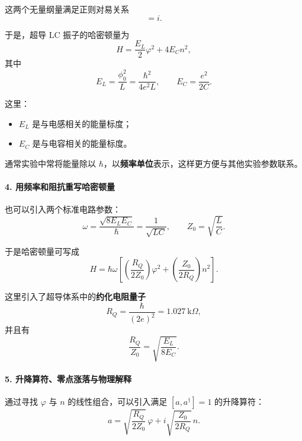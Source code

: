 \documentclass[12pt,a4paper,oneside]{ctexbook}
\begin{document}
这两个无量纲量满足正则对易关系
\begin{equation}
    [\varphi,n]=i.
    \tag{1}
\end{equation}

于是，超导 LC 振子的哈密顿量为
\begin{equation}
    H=\frac{E_L}{2}\varphi^2+4E_C n^2,
    \tag{2}
\end{equation}
其中
\[
    E_L=\frac{\phi_0^2}{L}=\frac{\hbar^2}{4e^2L},
    \qquad
    E_C=\frac{e^2}{2C}.
\]

这里：
\begin{itemize}[leftmargin=2em]
    \item \(E_L\) 是与电感相关的能量标度；
    \item \(E_C\) 是与电容相关的能量标度。
\end{itemize}

通常实验中常将能量除以 \(\hbar\)，以\textbf{频率单位}表示，这样更方便与其他实验参数联系。

\paragraph{4. 用频率和阻抗重写哈密顿量}

也可以引入两个标准电路参数：
\begin{equation}
    \omega=\frac{\sqrt{8E_LE_C}}{\hbar}=\frac{1}{\sqrt{LC}},
    \qquad
    Z_0=\sqrt{\frac{L}{C}}.
    \tag{3}
\end{equation}

于是哈密顿量可写成
\begin{equation}
    H=\hbar\omega
    \left[
        \left(\frac{R_Q}{2Z_0}\right)\varphi^2
        +
        \left(\frac{Z_0}{2R_Q}\right)n^2
    \right].
    \tag{4}
\end{equation}

这里引入了超导体系中的\textbf{约化电阻量子}
\[
    R_Q=\frac{\hbar}{(2e)^2}=1.027~\text{k}\Omega,
\]
并且有
\[
    \frac{R_Q}{Z_0}=\sqrt{\frac{E_L}{8E_C}}.
\]

\paragraph{5. 升降算符、零点涨落与物理解释}

通过寻找 \(\varphi\) 与 \(n\) 的线性组合，可以引入满足 \([a,a^\dagger]=1\) 的升降算符：
\begin{equation}
    a=\sqrt{\frac{R_Q}{2Z_0}}\,\varphi
    +
    i\sqrt{\frac{Z_0}{2R_Q}}\,n.
    \tag{5}
\end{equation}
\end{document}
